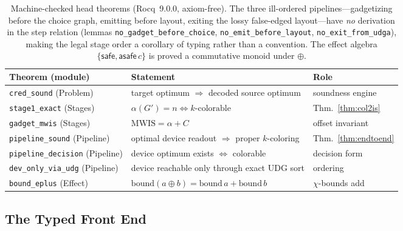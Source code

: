 \documentclass[11pt]{article}
\theoremstyle{definition}
\theoremstyle{remark}
\newcommand{\MWIS}{\mathrm{MWIS}}
\newcommand{\indep}{\alpha}
\begin{document}
\begin{table}[h]
\centering
\small
\begin{tabular}{@{}lll@{}}
\toprule
Theorem (module) & Statement & Role \\
\midrule
\texttt{cred\_sound} (Problem) & target optimum $\Rightarrow$ decoded source optimum & soundness engine \\
\texttt{stage1\_exact} (Stages) & $\indep(G')=n \iff k\text{-colorable}$ & Thm.~\ref{thm:col2is} \\
\texttt{gadget\_mwis} (Stages) & $\MWIS = \indep + C$ & offset invariant \\
\texttt{pipeline\_sound} (Pipeline) & optimal device readout $\Rightarrow$ proper $k$-coloring & Thm.~\ref{thm:endtoend} \\
\texttt{pipeline\_decision} (Pipeline) & device optimum exists $\iff$ colorable & decision form \\
\texttt{dev\_only\_via\_udg} (Pipeline) & device reachable only through exact UDG sort & ordering \\
\texttt{bound\_eplus} (Effect) & $\mathrm{bound}(a\oplus b)=\mathrm{bound}\,a+\mathrm{bound}\,b$ & $\chi$-bounds add \\
\bottomrule
\end{tabular}
\caption{Machine-checked head theorems (Rocq~9.0.0, axiom-free). The three
ill-ordered pipelines---gadgetizing before the choice graph, emitting before
layout, exiting the lossy false-edged layout---have \emph{no} derivation in the
step relation (lemmas \texttt{no\_gadget\_before\_choice},
\texttt{no\_emit\_before\_layout}, \texttt{no\_exit\_from\_udga}), making the legal
stage order a corollary of typing rather than a convention. The effect algebra
$\{\textsf{safe},\textsf{asafe}\,c\}$ is proved a commutative monoid under
$\oplus$.}
\label{tab:coq}
\end{table}

\subsection{The Typed Front End}
\label{sec:haskell}
\end{document}
